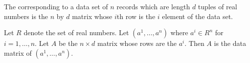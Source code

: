 
\sbasic























\sstart
{}



The 
corresponding to a data
set of $n$
records which are length $d$ tuples
of real numbers
is the $n$ by $d$ matrix
whose $i$th row is the $i$
element of the data set.


Let $R$ denote the set
of real numbers.
Let $(a^1, \dots, a^n)$
where $a^i \in R^n$ for
$i = 1, \dots, n$.
Let $A$ be the $n \times d$
matrix whose rows are
the $a^i$.
Then $A$ is the data matrix of
 $(a^1, \dots, a^n)$.

\strats
